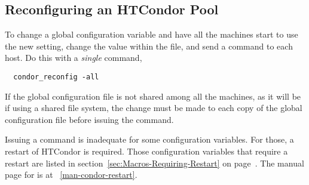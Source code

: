 \subsection{\label{sec:Reconfigure-Pool}Reconfiguring an HTCondor Pool}

To change a global configuration variable and have all the
machines start to use the new setting, change the value within the file,
and send a  command to each host.
Do this with a \emph{single} command,
\begin{verbatim}
  condor_reconfig -all
\end{verbatim}

If the global configuration file is not shared among all the machines,
as it will be if using a shared file system,
the change must be made to each copy of the global configuration file
before issuing the  command.

Issuing a  command is inadequate for some
configuration variables.
For those, a restart of HTCondor is required.
Those configuration variables that require a restart are listed in
section~\ref{sec:Macros-Requiring-Restart}
on page~\pageref{sec:Macros-Requiring-Restart}.
The manual page for  is at
~\ref{man-condor-restart}.

